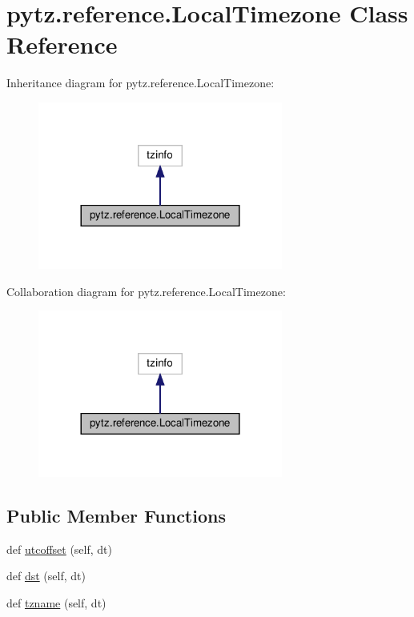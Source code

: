 \hypertarget{classpytz_1_1reference_1_1LocalTimezone}{}\section{pytz.\+reference.\+Local\+Timezone Class Reference}
\label{classpytz_1_1reference_1_1LocalTimezone}


Inheritance diagram for pytz.\+reference.\+Local\+Timezone\+:
\nopagebreak
\begin{figure}[H]
\begin{center}
\leavevmode
\includegraphics[width=228pt]{classpytz_1_1reference_1_1LocalTimezone__inherit__graph}
\end{center}
\end{figure}


Collaboration diagram for pytz.\+reference.\+Local\+Timezone\+:
\nopagebreak
\begin{figure}[H]
\begin{center}
\leavevmode
\includegraphics[width=228pt]{classpytz_1_1reference_1_1LocalTimezone__coll__graph}
\end{center}
\end{figure}
\subsection*{Public Member Functions}
\begin{DoxyCompactItemize}
\item 
def \hyperlink{classpytz_1_1reference_1_1LocalTimezone_a5ee2540a8c905e3a47d2a93943c4b73f}{utcoffset} (self, dt)
\item 
def \hyperlink{classpytz_1_1reference_1_1LocalTimezone_a6b256a8380be30f20b51eed45417cf8a}{dst} (self, dt)
\item 
def \hyperlink{classpytz_1_1reference_1_1LocalTimezone_a8c560431b780b471ea3d03d0b2b7f3d1}{tzname} (self, dt)
\end{DoxyCompactItemize}


